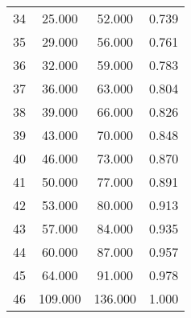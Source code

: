 \begin{tabular}{cccc}
  34 & 25.000 & 52.000 & 0.739 \\ 
  35 & 29.000 & 56.000 & 0.761 \\ 
  36 & 32.000 & 59.000 & 0.783 \\ 
  37 & 36.000 & 63.000 & 0.804 \\ 
  38 & 39.000 & 66.000 & 0.826 \\ 
  39 & 43.000 & 70.000 & 0.848 \\ 
  40 & 46.000 & 73.000 & 0.870 \\ 
  41 & 50.000 & 77.000 & 0.891 \\ 
  42 & 53.000 & 80.000 & 0.913 \\ 
  43 & 57.000 & 84.000 & 0.935 \\ 
  44 & 60.000 & 87.000 & 0.957 \\ 
  45 & 64.000 & 91.000 & 0.978 \\ 
  46 & 109.000 & 136.000 & 1.000 \\ 
   \hline
\end{tabular}
